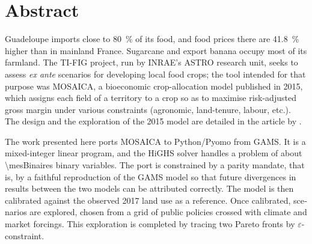 \chapter*{Abstract}


\begin{otherlanguage}{english}

Guadeloupe imports close to \SI{80}{\percent} of its food, and food prices there are
\SI{41.8}{\percent} higher than in mainland France. Sugarcane and export banana occupy most of its
farmland. The TI-FIG project, run by INRAE's ASTRO research unit, seeks to assess \emph{ex ante}
scenarios for developing local food crops; the tool intended for that purpose was MOSAICA, a
bioeconomic crop-allocation model published in 2015, which assigns each field of a territory to a
crop so as to maximise risk-adjusted gross margin under various constraints (agronomic,
land-tenure, labour, etc.). The design and the exploration of the 2015 model are detailed in the
article by \textcite{chopin2015}.

The work presented here ports MOSAICA to Python/Pyomo from GAMS. It is a mixed-integer linear
program, and the HiGHS solver handles a problem of about \num{\mesBinaires} binary variables. The
port is constrained by a parity mandate, that is, by a faithful reproduction of the GAMS model so
that future divergences in results between the two models can be attributed correctly. The model
is then calibrated against the observed 2017 land use as a reference. Once calibrated, scenarios
are explored, chosen from a grid of public policies crossed with climate and market forcings. This
exploration is completed by tracing two Pareto fronts by $\varepsilon$-constraint.


\end{otherlanguage}
